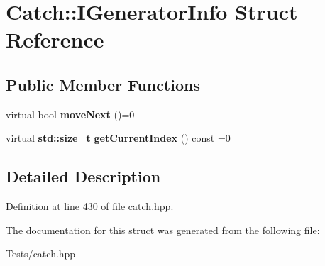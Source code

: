 \hypertarget{struct_catch_1_1_i_generator_info}{}\section{Catch\+:\+:I\+Generator\+Info Struct Reference}
\label{struct_catch_1_1_i_generator_info}
\subsection*{Public Member Functions}
\begin{DoxyCompactItemize}
\item 
\mbox{\label{struct_catch_1_1_i_generator_info_a2b86711ca7009903edfe27ed62b515ef}} 
virtual bool {\bfseries move\+Next} ()=0
\item 
\mbox{\label{struct_catch_1_1_i_generator_info_a6a0dca712d31f6849fd9447b1344673a}} 
virtual \textbf{ std\+::size\+\_\+t} {\bfseries get\+Current\+Index} () const =0
\end{DoxyCompactItemize}


\subsection{Detailed Description}


Definition at line 430 of file catch.\+hpp.



The documentation for this struct was generated from the following file\+:\begin{DoxyCompactItemize}
\item 
Tests/catch.\+hpp\end{DoxyCompactItemize}
